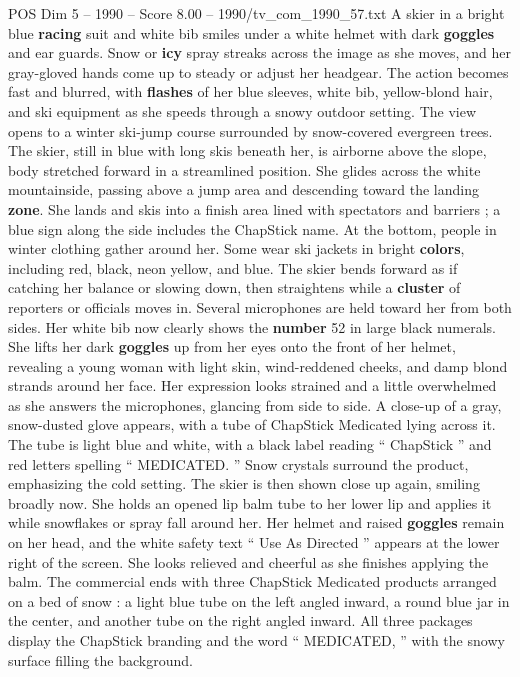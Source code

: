 \begin{textsample}{POS Dim 5 – 1990 – Score 8.00 – 1990/tv\_com\_1990\_57.txt}  \label{ex:f5_pos_018}
A skier in a bright blue \textbf{racing} suit and white bib smiles under a white helmet with dark \textbf{goggles} and ear guards.
Snow or \textbf{icy} spray streaks across the image as she moves, and her gray-gloved hands come up to steady or adjust her headgear.
The action becomes fast and blurred, with \textbf{flashes} of her blue sleeves, white bib, yellow-blond hair, and ski equipment as she speeds through a snowy outdoor setting.
The view opens to a winter ski-jump course surrounded by snow-covered evergreen trees.
The skier, still in blue with long skis beneath her, is airborne above the slope, body stretched forward in a streamlined position.
She glides across the white mountainside, passing above a jump area and descending toward the landing \textbf{zone}.
She lands and skis into a finish area lined with spectators and barriers ; a blue sign along the side includes the ChapStick name.
At the bottom, people in winter clothing gather around her.
Some wear ski jackets in bright \textbf{colors}, including red, black, neon yellow, and blue.
The skier bends forward as if catching her balance or slowing down, then straightens while a \textbf{cluster} of reporters or officials moves in.
Several microphones are held toward her from both sides.
Her white bib now clearly shows the \textbf{number} 52 in large black numerals.
She lifts her dark \textbf{goggles} up from her eyes onto the front of her helmet, revealing a young woman with light skin, wind-reddened cheeks, and damp blond strands around her face.
Her expression looks strained and a little overwhelmed as she answers the microphones, glancing from side to side.
A close-up of a gray, snow-dusted glove appears, with a tube of ChapStick Medicated lying across it.
The tube is light blue and white, with a black label reading “ ChapStick ” and red letters spelling “ MEDICATED. ” Snow crystals surround the product, emphasizing the cold setting.
The skier is then shown close up again, smiling broadly now.
She holds an opened lip balm tube to her lower lip and applies it while snowflakes or spray fall around her.
Her helmet and raised \textbf{goggles} remain on her head, and the white safety text “ Use As Directed ” appears at the lower right of the screen.
She looks relieved and cheerful as she finishes applying the balm.
The commercial ends with three ChapStick Medicated products arranged on a bed of snow : a light blue tube on the left angled inward, a round blue jar in the center, and another tube on the right angled inward.
All three packages display the ChapStick branding and the word “ MEDICATED, ” with the snowy surface filling the background.

\end{textsample}
